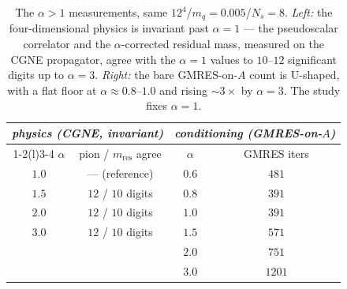 \documentclass[12pt,a4paper]{article}
\newcommand{\Aop}{A}
\begin{document}
\begin{table}[h]
\centering
\begin{tabular}{cc@{\qquad}cc}
\toprule
\multicolumn{2}{c}{\emph{physics (CGNE, invariant)}} & \multicolumn{2}{c}{\emph{conditioning (GMRES-on-$\Aop$)}}\\
\cmidrule(r){1-2}\cmidrule(l){3-4}
$\alpha$ & pion / $m_{\mathrm{res}}$ agree & $\alpha$ & GMRES iters \\
\midrule
$1.0$ & --- (reference)        & $0.6$ & $481$ \\
$1.5$ & $12$ / $10$ digits     & $0.8$ & $391$ \\
$2.0$ & $12$ / $10$ digits     & $1.0$ & $391$ \\
$3.0$ & $12$ / $10$ digits     & $1.5$ & $571$ \\
      &                        & $2.0$ & $751$ \\
      &                        & $3.0$ & $1201$ \\
\bottomrule
\end{tabular}
\caption{The $\alpha\!>\!1$ measurements, same $12^4$/$m_q\!=\!0.005$/$N_s\!=\!8$.
\emph{Left:} the four-dimensional physics is invariant past $\alpha=1$ --- the
pseudoscalar correlator and the $\alpha$-corrected residual mass, measured on the
CGNE propagator, agree with the $\alpha=1$ values to $10$--$12$ significant digits
up to $\alpha=3$. \emph{Right:} the bare GMRES-on-$\Aop$ count is U-shaped, with a
flat floor at $\alpha\approx0.8$--$1.0$ and rising ${\sim}3\times$ by $\alpha=3$.
The study fixes $\alpha=1$.}
\label{tab:alpha_gt1}
\end{table}
\end{document}

